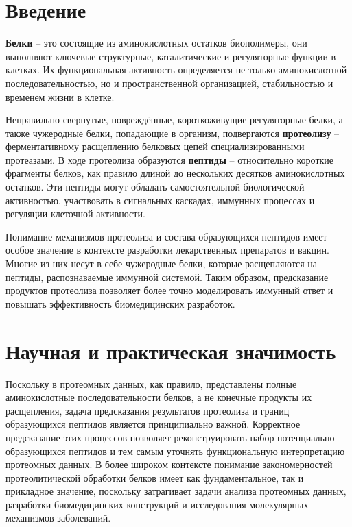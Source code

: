\documentclass{article}
\begin{document}
\newpage
\tableofcontents

\newpage
\section{Введение}
\textbf{Белки} -- это состоящие из аминокислотных остатков биополимеры, они выполняют ключевые структурные, каталитические и регуляторные функции в клетках. Их функциональная активность определяется не только аминокислотной последовательностью, но и пространственной организацией, стабильностью и временем жизни в клетке.

Неправильно свернутые, повреждённые, короткоживущие регуляторные белки, а также чужеродные белки, попадающие в организм, подвергаются \textbf{протеолизу} -- ферментативному расщеплению белковых цепей специализированными протеазами. В ходе протеолиза образуются \textbf{пептиды} -- относительно короткие фрагменты белков, как правило длиной до нескольких десятков аминокислотных остатков. Эти пептиды могут обладать самостоятельной биологической активностью, участвовать в сигнальных каскадах, иммунных процессах и регуляции клеточной активности.

Понимание механизмов протеолиза и состава образующихся пептидов имеет особое значение в контексте разработки лекарственных препаратов и вакцин. Многие из них несут в себе чужеродные белки, которые расщепляются на пептиды, распознаваемые иммунной системой. Таким образом, предсказание продуктов протеолиза позволяет более точно моделировать иммунный ответ и повышать эффективность биомедицинских разработок.

\section{Научная и практическая значимость}

Поскольку в протеомных данных, как правило, представлены полные аминокислотные последовательности белков, а не конечные продукты их расщепления, задача предсказания результатов протеолиза и границ образующихся пептидов является принципиально важной. Корректное предсказание этих процессов позволяет реконструировать набор потенциально образующихся пептидов и тем самым уточнять функциональную интерпретацию протеомных данных. В более широком контексте понимание закономерностей протеолитической обработки белков имеет как фундаментальное, так и прикладное значение, поскольку затрагивает задачи анализа протеомных данных, разработки биомедицинских конструкций и исследования молекулярных механизмов заболеваний.
\end{document}
